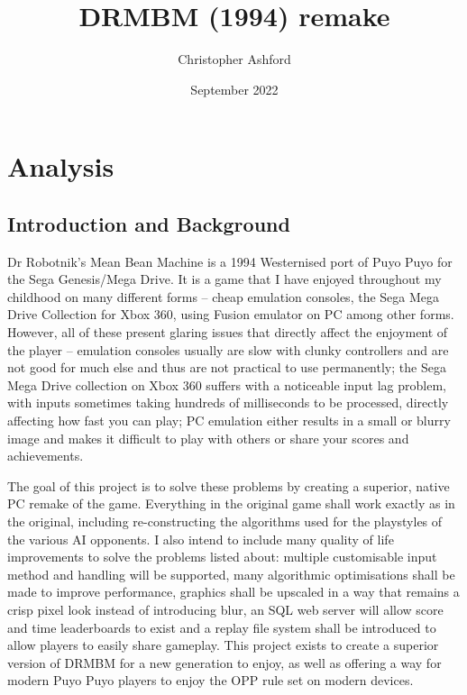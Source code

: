 \documentclass{report}
\title{DRMBM (1994) remake}
\author{Christopher Ashford}
\date{September 2022}
\begin{document}
\maketitle

\tableofcontents

\chapter{Analysis}

\section{Introduction and Background}

Dr Robotnik’s Mean Bean Machine is a 1994 Westernised port of Puyo Puyo for the Sega Genesis/Mega Drive. It is a game that I have enjoyed throughout my childhood on many different forms – cheap emulation consoles, the Sega Mega Drive Collection for Xbox 360, using Fusion emulator on PC among other forms. However, all of these present glaring issues that directly affect the enjoyment of the player – emulation consoles usually are slow with clunky controllers and are not good for much else and thus are not practical to use permanently; the Sega Mega Drive collection on Xbox 360 suffers with a noticeable input lag problem, with inputs sometimes taking hundreds of milliseconds to be processed, directly affecting how fast you can play; PC emulation either results in a small or blurry image and makes it difficult to play with others or share your scores and achievements.

The goal of this project is to solve these problems by creating a superior, native PC remake of the game. Everything in the original game shall work exactly as in the original, including re-constructing the algorithms used for the playstyles of the various AI opponents. I also intend to include many quality of life improvements to solve the problems listed about: multiple customisable input method and handling will be supported, many algorithmic optimisations shall be made to improve performance, graphics shall be upscaled in a way that remains a crisp pixel look instead of introducing blur, an SQL web server will allow score and time leaderboards to exist and a replay file system shall be introduced to allow players to easily share gameplay. This project exists to create a superior version of DRMBM for a new generation to enjoy, as well as offering a way for modern Puyo Puyo players to enjoy the OPP rule set on modern devices.
\end{document}
